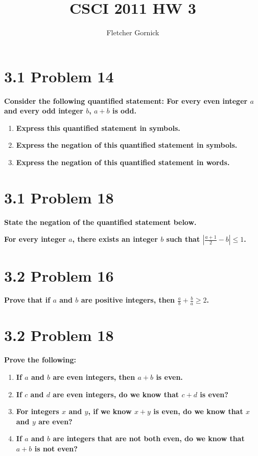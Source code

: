 \documentclass[10pt]{article}
\title{CSCI 2011 HW 3}
\author{Fletcher Gornick}
\begin{document}
\maketitle

\section{3.1 Problem 14}
\textbf{Consider the following quantified statement: For every even integer $a$ and every odd integer
$b$, $a + b$ is odd.}

\begin{enumerate}[label=(\alph*)]
    
    \item \textbf{Express this quantified statement in symbols.}

    \item \textbf{Express the negation of this quantified statement in symbols.}
        
    \item \textbf{Express the negation of this quantified statement in words.}

\end{enumerate}



\section{3.1 Problem 18}
\textbf{State the negation of the quantified statement below.}

\textbf{For every integer $a$, there exists an integer $b$ such that $|\frac{a+1}{2} - b| \leq 1$.}


\section{3.2 Problem 16}
\textbf{Prove that if $a$ and $b$ are positive integers, then $\frac{a}{b} + \frac{b}{a} \geq 2$.}



\section{3.2 Problem 18}
\textbf{Prove the following:}

\begin{enumerate}[label=(\alph*)]

    \item \textbf{If $a$ and $b$ are even integers, then $a+b$ is even.}

    \item \textbf{If $c$ and $d$ are even integers, do we know that $c+d$ is even?}

    \item \textbf{For integers $x$ and $y$, if we know $x+y$ is even, do we know that $x$ and $y$
        are even?}

    \item \textbf{If $a$ and $b$ are integers that are not both even, do we know that $a+b$ is
        not even?}

\end{enumerate}
\end{document}
